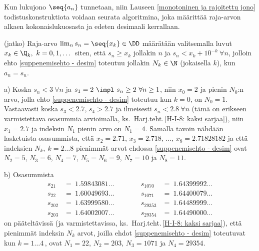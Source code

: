 Kun lukujono $\seq{a_n}$ tunnetaan, niin Lauseen \ref{monotoninen ja rajoitettu jono}
todistuskonstruktiota voidaan seurata algoritmina, joka määrittää raja-arvon
alkaen kokonaislukuosasta ja edeten desimaali kerrallaan.
\jatko\jatko \begin{Exa} (jatko) Raja-arvo $\lim_n s_n = \seq{x_k}\in\DD$ määrätään
valitsemalla luvut $x_k\in\Q_k,\ k=0,1,\ldots\,$ siten, että $s_n \ge x_k$ jollakin $n$
ja $s_n < x_k + 10^{-k}\ \forall n$, jolloin ehto \eqref{suppenemisehto - desim} toteutuu 
jollakin $N_k\in\N$ (jokaisella $k$), kun $a_n=s_n$.
 
a) Koska $s_n < 3\ \forall n$ ja $s_1=2\ \impl\ s_n \ge 2\ \forall n \ge 1$, niin $x_0=2$ ja
pienin $N_0$:n arvo, jolla ehto \eqref{suppenemisehto - desim} toteutuu kun $k=0$, on $N_0=1$.
Vastaavasti koska $s_3 < 2.7$, $s_4 > 2.7$ ja ilmeisesti $s_n < 2.8\ \forall n$ (tämä on 
erikseen varmistettava osasummia arvioimalla, ks.\ Harj.teht.\,\ref{H-I-8: kaksi sarjaa}),
niin $x_1=2.7$ ja indeksin $N_1$ pienin arvo on $N_1=4$. Samalla tavoin nähdään lasketuista
osasummista, että $x_2=2.71,\,x_3=2.718,\,\ldots,\,x_8=2.71828182$ ja että indeksien 
$N_k,\ k=2 \ldots 8$ pienimmät arvot ehdossa \eqref{suppenemisehto - desim} ovat $N_2=5$,
$N_3=6$, $N_4=7$, $N_5=N_6=9$, $N_7=10$ ja $N_8=11$.

b) Osasummista
\[
\begin{aligned}
s_{21}  &=\ 1.59843081 \ldots \\
s_{22}  &=\ 1.60049693 \ldots \\[2mm]
s_{202} &=\ 1.63999580 \ldots \\
s_{203} &=\ 1.64002007 \ldots
\end{aligned} \qquad\quad
\begin{aligned}
s_{1070}  &=\ 1.64399992 \ldots \\
s_{1071}  &=\ 1.64400079 \ldots \\[2mm]  
s_{29353} &=\ 1.64489999 \ldots \\
s_{29354} &=\ 1.64490000 \ldots
\end{aligned}
\]
on pääteltävissä (ja varmistettavissa, ks.\ Harj.teht.\,\ref{H-I-8: kaksi sarjaa}), että
pienimmät indeksin $N_k$ arvot, joilla ehdot \eqref{suppenemisehto - desim} toteutuvat 
kun $k=1 \ldots 4\,$, ovat $N_1=22$, $N_2=203$, $N_3=1071$ ja $N_4=29354$. \loppu
\end{Exa} \seur
